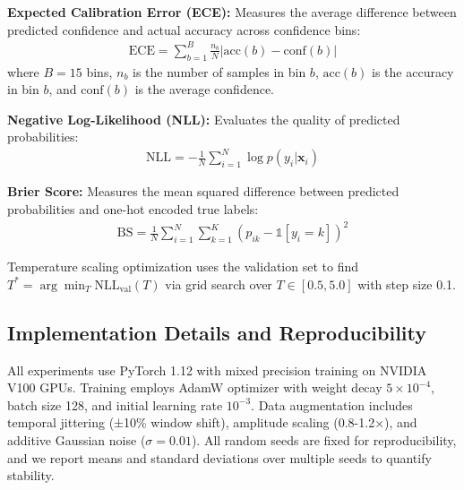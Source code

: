 \documentclass[lettersize,journal]{IEEEtran}
\begin{document}
\textbf{Expected Calibration Error (ECE):} Measures the average difference between predicted confidence and actual accuracy across confidence bins:
\begin{align}
\text{ECE} = \sum_{b=1}^{B} \frac{n_b}{N} |\text{acc}(b) - \text{conf}(b)|
\end{align}
where $B=15$ bins, $n_b$ is the number of samples in bin $b$, $\text{acc}(b)$ is the accuracy in bin $b$, and $\text{conf}(b)$ is the average confidence.

\textbf{Negative Log-Likelihood (NLL):} Evaluates the quality of predicted probabilities:
\begin{align}
\text{NLL} = -\frac{1}{N} \sum_{i=1}^{N} \log p(y_i | \mathbf{x}_i)
\end{align}

\textbf{Brier Score:} Measures the mean squared difference between predicted probabilities and one-hot encoded true labels:
\begin{align}
\text{BS} = \frac{1}{N} \sum_{i=1}^{N} \sum_{k=1}^{K} (p_{ik} - \mathbb{1}[y_i = k])^2
\end{align}

Temperature scaling optimization uses the validation set to find $T^* = \arg\min_T \text{NLL}_{\text{val}}(T)$ via grid search over $T \in [0.5, 5.0]$ with step size 0.1.

\subsection{Implementation Details and Reproducibility}

All experiments use PyTorch 1.12 with mixed precision training on NVIDIA V100 GPUs. Training employs AdamW optimizer with weight decay $5 \times 10^{-4}$, batch size 128, and initial learning rate $10^{-3}$. Data augmentation includes temporal jittering (±10\% window shift), amplitude scaling (0.8-1.2×), and additive Gaussian noise ($\sigma=0.01$). All random seeds are fixed for reproducibility, and we report means and standard deviations over multiple seeds to quantify stability.
\end{document}
